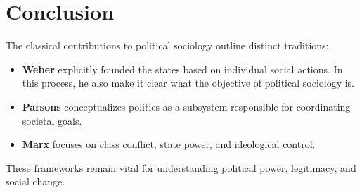 \documentclass[12pt]{article}
\begin{document}
\section*{Conclusion}

The classical contributions to political sociology outline distinct traditions:
\begin{itemize}
    \item \textbf{Weber} explicitly founded the states based on individual social actions. In this process, he also make it clear what the objective of political sociology is.
    \item \textbf{Parsons} conceptualizes politics as a subsystem responsible for coordinating societal goals.
    \item \textbf{Marx} focuses on class conflict, state power, and ideological control.
\end{itemize}

These frameworks remain vital for understanding political power, legitimacy, and social change.

\printbibliography
\end{document}
